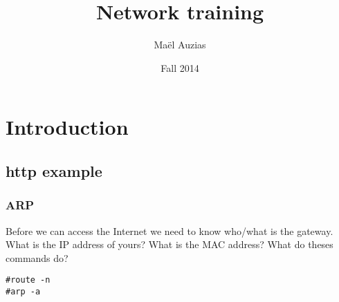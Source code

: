 \documentclass[11pt]{article}
\begin{document}
\title{Network training}
\date{Fall 2014}
\author{Maël Auzias}
\maketitle

\tableofcontents
\pagebreak


\section{Introduction}
\subsection{http example}
\subsubsection{ARP}
Before we can access the Internet we need to know who/what is the gateway. What is the IP address of yours? What is the MAC address? What do theses commands do?
\begin{lstlisting}
#route -n
#arp -a
\end{lstlisting}
\end{document}
